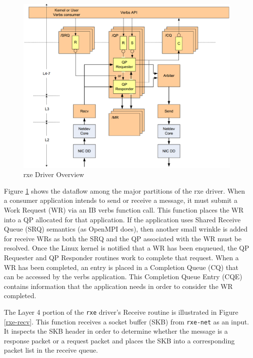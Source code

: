 \documentclass[11pt]{book}
\begin{document}
\begin{figure}[!t]
\includegraphics[width=\textwidth]{rxe_overview}
\caption{rxe Driver Overview \protect\cite{pearson-10}}\label{rxe-overview}
\end{figure}

Figure \ref{rxe-overview} shows the dataflow among the major partitions of the rxe
driver.  When a consumer application intends to send or receive a message, it must submit a
Work Request (WR) via an IB verbs function call.  This function places the WR into a QP
allocated for that application.  If the application uses Shared Receive Queue (SRQ)
semantics (as OpenMPI does), then another small wrinkle is added for receive WRs as both
the SRQ and the QP associated with the WR must be resolved.  Once the Linux kernel is
notified that a WR has been enqueued, the QP Requester and QP Responder routines work to
complete that request.  When a WR has been completed, an entry is placed in a Completion
Queue (CQ) that can be accessed by the verbs application.  This Completion Queue Entry
(CQE) contains information that the application needs in order to consider the WR
completed.

The Layer 4 portion of the \verb;rxe; driver's Receive routine is illustrated in Figure
\ref{rxe-recv}.  This function receives a socket buffer (SKB) from \verb;rxe-net; as an
input.  It inspects the SKB header in order to determine whether the message is a response
packet or a request packet and places the SKB into a corresponding packet list in the
receive queue.
\end{document}
